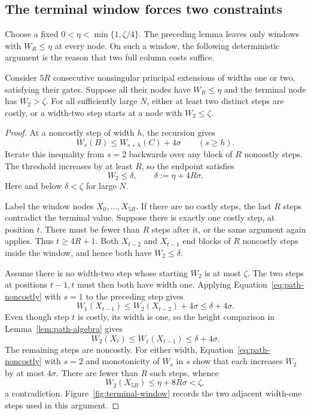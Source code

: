 \subsection{The terminal window forces two constraints}

Choose a fixed
\(0<\eta<\min\{1,\zeta/4\}\). The preceding lemma leaves only
windows with \(W_R\le\eta\) at every node. On such a window,
the following deterministic argument is the reason that two full
column costs suffice.

\begin{lemma}\label{lem:path-window}
Consider \(5R\) consecutive nonsingular principal extensions of
widths one or two, satisfying their gates. Suppose all their nodes
have \(W_R\le\eta\) and the terminal node has \(W_2>\zeta\).
For all sufficiently large \(N\), either at least two distinct steps
are costly, or a width-two step starts at a node with
\(W_2\le\zeta\).
\end{lemma}

\begin{proof}
At a noncostly step of width \(h\), the recursion gives
\begin{equation}\label{eq:path-noncostly}
 W_s(B)\le W_{s+h}(C)+4\sigma
       \qquad(s\ge h).
\end{equation}
Iterate this inequality from \(s=2\) backwards over any block of
\(R\) noncostly steps. The threshold increases by at least \(R\),
so the endpoint satisfies
\[
 W_2\le\delta,\qquad \delta:=\eta+4R\sigma.
\]
Here and below \(\delta<\zeta\) for large \(N\).

Label the window nodes \(X_0,\ldots,X_{5R}\). If there are no
costly steps, the last \(R\) steps contradict the terminal value.
Suppose there is exactly one costly step, at position \(t\).
There must be fewer than \(R\) steps after it, or the same argument
again applies. Thus \(t\ge4R+1\). Both \(X_{t-2}\) and
\(X_{t-1}\) end blocks of \(R\) noncostly steps inside the window,
and hence both have \(W_2\le\delta\).

Assume there is no width-two step whose starting \(W_2\) is at
most \(\zeta\). The two steps at positions \(t-1,t\) must then
both have width one. Applying Equation~\eqref{eq:path-noncostly}
with \(s=1\) to the preceding step gives
\[
 W_1(X_{t-1})\le W_2(X_{t-2})+4\sigma\le\delta+4\sigma.
\]
Even though step \(t\) is costly, its width is one, so the height
comparison in Lemma~\ref{lem:path-algebra} gives
\[
 W_2(X_t)\le W_1(X_{t-1})\le\delta+4\sigma.
\]
The remaining steps are noncostly. For either width,
Equation~\eqref{eq:path-noncostly} with \(s=2\) and monotonicity
of \(W_s\) in \(s\) show that each increases \(W_2\) by at most
\(4\sigma\). There are fewer than \(R\) such steps, whence
\[
 W_2(X_{5R})\le\eta+8R\sigma<\zeta,
\]
a contradiction. Figure~\ref{fig:terminal-window} records the two
adjacent width-one steps used in this argument.
\end{proof}


